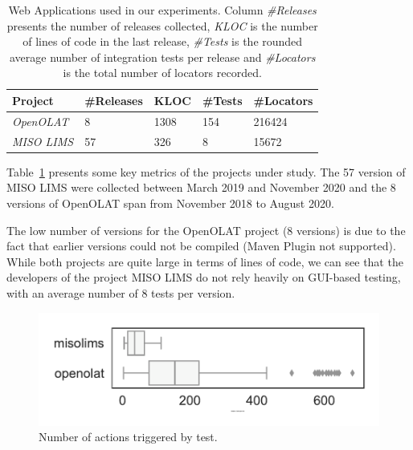 \begin{table}
\centering
\caption{Web Applications used in our experiments. Column \emph{\#Releases} presents the number of releases collected, \emph{KLOC} is the number of lines of code in the last release, \emph{\#Tests} is the rounded average number of integration tests per release and \emph{\#Locators} is the total number of locators recorded.}
\label{tab:hpath-protocol-projects}
\begin{tabular}{>{\raggedright}m{0.4in}>{\raggedleft}m{0.4in}>{\raggedleft}m{0.4in}>{\raggedleft}m{0.4in}>{\raggedleft}m{0.4in}}
\toprule
\textbf{\scriptsize{Project}} & \textbf{\scriptsize{\#Releases}} & \textbf{\scriptsize{KLOC}} & \textbf{\scriptsize{\#Tests}} & \textbf{\scriptsize{\#Locators}} \tabularnewline
\toprule
\scriptsize{\textit{OpenOLAT}} & \scriptsize{8} & \scriptsize{1308} & \scriptsize{154} & \scriptsize{216424} \tabularnewline
\scriptsize{\textit{MISO LIMS}} & \scriptsize{57} & \scriptsize{326} & \scriptsize{8} & \scriptsize{15672} \tabularnewline
\bottomrule
\end{tabular}
\end{table}

Table~\ref{tab:hpath-protocol-projects} presents some key metrics of the projects under study. The 57 version of MISO LIMS were collected between March 2019 and November 2020 and the 8 versions of OpenOLAT span from November 2018 to August 2020. 

The low number of versions for the OpenOLAT project (8 versions) is due to the fact that earlier versions could not be compiled (Maven Plugin not supported). While both projects are quite large in terms of lines of code, we can see that the developers of the project MISO LIMS do not rely heavily on GUI-based testing, with an average number of 8 tests per version.

\begin{figure}
\centering
\includegraphics[width=0.8\columnwidth]{figures/hpath/selector-per-test-dist.pdf}
\caption{Number of actions triggered by test.}  
\label{fig:hpath-protocol-actions}
\end{figure}

